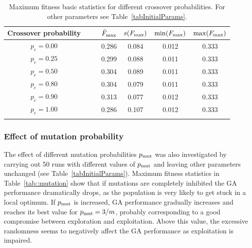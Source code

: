 \documentclass[12pt,titlepage]{article}
\begin{document}
\begin{table}[H]
\centering
\begin{tabular}{cc|cccc}
\toprule
\multicolumn{1}{c}{Crossover probability} & $\quad$ & $\bar{F}_{\textup{max}}$ & $s(F_{\textup{max}})$ & $\min(F_{\textup{max}})$ & $\max(F_{\textup{max}})$ \\
\midrule
$ p_c = 0.00 $ & & 0.286 & 0.084 & 0.012 & 0.333 \\
$ p_c = 0.25 $ & & 0.299 & 0.088 & 0.011 & 0.333 \\
$ p_c = 0.50 $ & & 0.304 & 0.089 & 0.011 & 0.333 \\
$ p_c = 0.80 $ & & 0.304 & 0.079 & 0.011 & 0.333 \\
$ p_c = 0.90 $ & & 0.313 & 0.077 & 0.012 & 0.333 \\
$ p_c = 1.00 $ & & 0.286 & 0.107 & 0.012 & 0.333 \\
\bottomrule
\caption{Maximum fitness basic statistics for different crossover probabilities. For other parameters see Table~\ref{tabInitialParams}.}
\label{tab::crossover}
\end{tabular}
\end{table}

\subsubsection*{Effect of mutation probability}
The effect of different mutation probabilities $p_{\textup{mut}}$ was also investigated by carrying out 50 runs with different values of $p_{\textup{mut}}$ and leaving other parameters unchanged (see Table~\ref{tabInitialParams}). Maximum fitness statistics in Table~\ref{tab::mutation} show that if mutations are completely inhibited the GA performance dramatically drops, as the population is very likely to get stuck in a local optimum. If $p_{\textup{mut}}$ is increased, GA performance gradually increases and reaches its best value for $p_{\textup{mut}} = 3/m$, probably corresponding to a good compromise between exploration and exploitation. Above this value, the excessive randomness seems to negatively affect the GA performance as exploitation is impaired.
\end{document}
